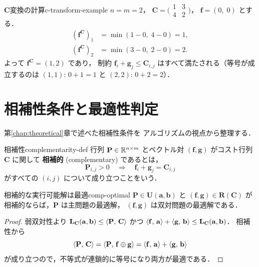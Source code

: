 \begin{example}{$\mathbf{C}$変換の計算}{c-transform-example}
$n = m = 2$，
$\mathbf{C} = \bigl(\begin{smallmatrix} 1 & 3 \\ 4 & 2 \end{smallmatrix}\bigr)$，
$\mathbf{f} = (0,\; 0)$ とする．
\begin{align*}
  (\mathbf{f}^{\mathbf{C}})_1
  &= \min(1-0,\; 4-0) = 1, \\
  (\mathbf{f}^{\mathbf{C}})_2
  &= \min(3-0,\; 2-0) = 2.
\end{align*}
よって $\mathbf{f}^{\mathbf{C}} = (1, 2)$ であり，
制約 $\mathbf{f}_i + \mathbf{g}_j \leq \mathbf{C}_{i,j}$
はすべて満たされる（等号が成立するのは
$(1,1)$: $0+1=1$ と $(2,2)$: $0+2=2$）．
\end{example}


\section{相補性条件と最適性判定}\label{sec:complementary}

第\ref{chap:theoretical}章で述べた相補性条件を
アルゴリズムの視点から整理する．

\begin{definition}{相補性}{complementarity-def}
行列 $\mathbf{P} \in \mathbb{R}^{n \times m}$ とベクトル対
$(\mathbf{f}, \mathbf{g})$ がコスト行列 $\mathbf{C}$ に関して
\textbf{相補的} (complementary) であるとは，
\[
  \mathbf{P}_{i,j} > 0
  \quad \Longrightarrow \quad
  \mathbf{f}_i + \mathbf{g}_j = \mathbf{C}_{i,j}
\]
がすべての $(i,j)$ について成り立つことをいう．
\end{definition}

\begin{proposition}{相補的な実行可能解は最適}{comp-optimal}
$\mathbf{P} \in \mathbf{U}(\mathbf{a}, \mathbf{b})$ と
$(\mathbf{f}, \mathbf{g}) \in \mathbf{R}(\mathbf{C})$ が
相補的ならば，$\mathbf{P}$ は主問題の最適解，
$(\mathbf{f}, \mathbf{g})$ は双対問題の最適解である．
\end{proposition}

\begin{proof}
弱双対性より
$\mathbf{L_C}(\mathbf{a}, \mathbf{b})
\leq \langle \mathbf{P},\, \mathbf{C} \rangle$ かつ
$\langle \mathbf{f},\, \mathbf{a} \rangle + \langle \mathbf{g},\, \mathbf{b} \rangle
\leq \mathbf{L_C}(\mathbf{a}, \mathbf{b})$．
相補性から
\[
  \langle \mathbf{P},\, \mathbf{C} \rangle
  = \langle \mathbf{P},\, \mathbf{f} \oplus \mathbf{g} \rangle
  = \langle \mathbf{f},\, \mathbf{a} \rangle + \langle \mathbf{g},\, \mathbf{b} \rangle
\]
が成り立つので，不等式が連鎖的に等号になり両方が最適である．
\end{proof}

